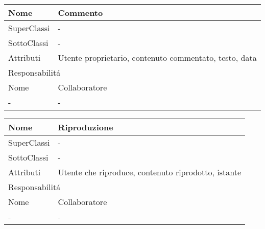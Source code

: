 \begin{center}
    \begin{tabular}{ |p{3cm}|p{3cm}|p{3cm}|p{3cm}| }
        \hline
        Nome & \multicolumn{3}{|p{9cm}|}{Commento} \\\hline
        SuperClassi & \multicolumn{3}{|p{9cm}|}{-} \\\hline
        SottoClassi & \multicolumn{3}{|p{9cm}|}{-} \\\hline
        Attributi & \multicolumn{3}{|p{9cm}|}{Utente proprietario, contenuto commentato, testo, data} \\\hline
        \multicolumn{4}{|p{12cm}|}{Responsabilit\'a} \\\hline
        \multicolumn{2}{|p{6cm}|}{Nome} & \multicolumn{2}{|p{6cm}|}{Collaboratore} \\\hline
        \multicolumn{2}{|p{6cm}|}{-} & \multicolumn{2}{|p{6cm}|}{-} \\\hline
    \end{tabular}
\end{center}

\begin{center}
    \begin{tabular}{ |p{3cm}|p{3cm}|p{3cm}|p{3cm}| }
        \hline
        Nome & \multicolumn{3}{|p{9cm}|}{Riproduzione} \\\hline
        SuperClassi & \multicolumn{3}{|p{9cm}|}{-} \\\hline
        SottoClassi & \multicolumn{3}{|p{9cm}|}{-} \\\hline
        Attributi & \multicolumn{3}{|p{9cm}|}{Utente che riproduce, contenuto riprodotto, istante} \\\hline
        \multicolumn{4}{|p{12cm}|}{Responsabilit\'a} \\\hline
        \multicolumn{2}{|p{6cm}|}{Nome} & \multicolumn{2}{|p{6cm}|}{Collaboratore} \\\hline
        \multicolumn{2}{|p{6cm}|}{-} & \multicolumn{2}{|p{6cm}|}{-} \\\hline
    \end{tabular}
\end{center}

